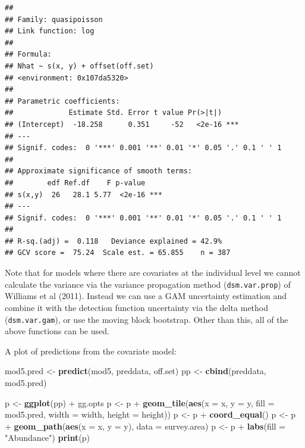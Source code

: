 \documentclass[]{amsart}
\newenvironment{Shaded}{}{}
\newcommand{\KeywordTok}[1]{\textcolor[rgb]{0.00,0.44,0.13}{\textbf{{#1}}}}
\newcommand{\DataTypeTok}[1]{\textcolor[rgb]{0.56,0.13,0.00}{{#1}}}
\newcommand{\StringTok}[1]{\textcolor[rgb]{0.25,0.44,0.63}{{#1}}}
\newcommand{\NormalTok}[1]{{#1}}
\begin{document}
\begin{verbatim}
## 
## Family: quasipoisson 
## Link function: log 
## 
## Formula:
## Nhat ~ s(x, y) + offset(off.set)
## <environment: 0x107da5320>
## 
## Parametric coefficients:
##             Estimate Std. Error t value Pr(>|t|)    
## (Intercept)  -18.258      0.351     -52   <2e-16 ***
## ---
## Signif. codes:  0 '***' 0.001 '**' 0.01 '*' 0.05 '.' 0.1 ' ' 1
## 
## Approximate significance of smooth terms:
##        edf Ref.df    F p-value    
## s(x,y)  26   28.1 5.77  <2e-16 ***
## ---
## Signif. codes:  0 '***' 0.001 '**' 0.01 '*' 0.05 '.' 0.1 ' ' 1
## 
## R-sq.(adj) =  0.118   Deviance explained = 42.9%
## GCV score =  75.24  Scale est. = 65.855    n = 387
\end{verbatim}

Note that for models where there are covariates at the individual level
we cannot calculate the variance via the variance propagation method
(\texttt{dsm.var.prop}) of Williams et al (2011). Instead we can use a
GAM uncertainty estimation and combine it with the detection function
uncertainty via the delta method (\texttt{dsm.var.gam}), or use the
moving block bootstrap. Other than this, all of the above functions can
be used.

A plot of predictions from the covariate model:

\begin{Shaded}
\begin{Highlighting}[]
\NormalTok{mod5.pred <-}\StringTok{ }\KeywordTok{predict}\NormalTok{(mod5, preddata, off.set)}
\NormalTok{pp <-}\StringTok{ }\KeywordTok{cbind}\NormalTok{(preddata, mod5.pred)}

\NormalTok{p <-}\StringTok{ }\KeywordTok{ggplot}\NormalTok{(pp) +}\StringTok{ }\NormalTok{gg.opts}
\NormalTok{p <-}\StringTok{ }\NormalTok{p +}\StringTok{ }\KeywordTok{geom_tile}\NormalTok{(}\KeywordTok{aes}\NormalTok{(}\DataTypeTok{x =} \NormalTok{x, }\DataTypeTok{y =} \NormalTok{y, }\DataTypeTok{fill =} \NormalTok{mod5.pred, }
    \DataTypeTok{width =} \NormalTok{width, }\DataTypeTok{height =} \NormalTok{height))}
\NormalTok{p <-}\StringTok{ }\NormalTok{p +}\StringTok{ }\KeywordTok{coord_equal}\NormalTok{()}
\NormalTok{p <-}\StringTok{ }\NormalTok{p +}\StringTok{ }\KeywordTok{geom_path}\NormalTok{(}\KeywordTok{aes}\NormalTok{(}\DataTypeTok{x =} \NormalTok{x, }\DataTypeTok{y =} \NormalTok{y), }\DataTypeTok{data =} \NormalTok{survey.area)}
\NormalTok{p <-}\StringTok{ }\NormalTok{p +}\StringTok{ }\KeywordTok{labs}\NormalTok{(}\DataTypeTok{fill =} \StringTok{"Abundance"}\NormalTok{)}
\KeywordTok{print}\NormalTok{(p)}
\end{Highlighting}
\end{Shaded}
\end{document}
